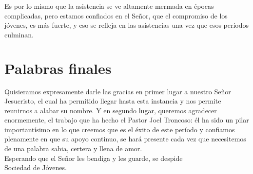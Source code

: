 \documentclass[12pt,letterpaper]{article}
\begin{document}
Es por lo mismo que la asistencia se ve altamente mermada en épocas complicadas, pero estamos confiados en el Señor, que el compromiso de los jóvenes, es más fuerte, y eso se refleja en las asistencias una vez que esos períodos culminan.

\section{Palabras finales}
Quisieramos expresamente darle las gracias en primer lugar a nuestro Señor Jesucristo, el cual ha permitido llegar hasta esta instancia y nos permite reunirnos a alabar su nombre. Y en segundo lugar, queremos agradecer enormemente, el trabajo que ha hecho el Pastor Joel Troncoso: él ha sido un pilar importantísimo en lo que creemos que es el éxito de este período y confiamos plenamente en que su apoyo continuo, se hará presente cada vez que necesitemos de una palabra sabia, certera y llena de amor.
\\

Esperando que el Señor les bendiga y les guarde, se despide\\

Sociedad de Jóvenes.
\end{document}
